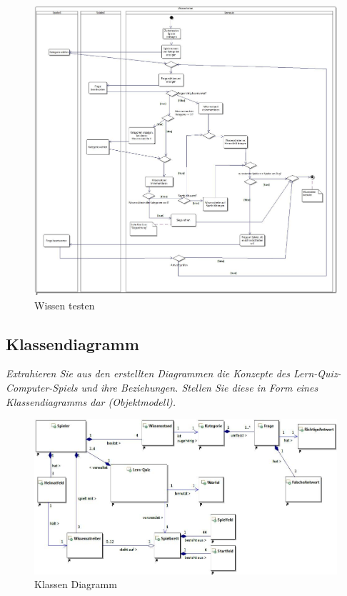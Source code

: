 \documentclass{report}
\begin{document}
\begin{figure}[H]
	\includegraphics[width=\textwidth]{Diagramme/ActivityDiagram-WissenTesten.jpg}
	\caption{Wissen testen}
	\centering
\end{figure}


\subsection{Klassendiagramm}
\textit{Extrahieren Sie aus den erstellten Diagrammen die Konzepte des Lern-Quiz-Computer-Spiels und ihre Beziehungen. Stellen Sie diese in Form eines Klassendiagramms dar (Objektmodell).}
\begin{figure}[H]
	\includegraphics[width=\textwidth]{Diagramme/ClassDiagram.jpg}
	\caption{Klassen Diagramm}
	\centering
\end{figure}
\end{document}
